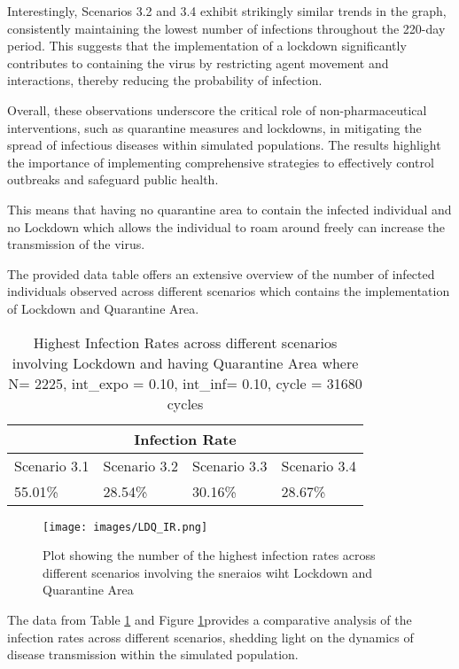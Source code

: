 Interestingly, Scenarios 3.2 and 3.4 exhibit strikingly similar trends in the graph, consistently maintaining the lowest number of infections throughout the 220-day period. This suggests that the implementation of a lockdown significantly contributes to containing the virus by restricting agent movement and interactions, thereby reducing the probability of infection. 

Overall, these observations underscore the critical role of non-pharmaceutical interventions, such as quarantine measures and lockdowns, in mitigating the spread of infectious diseases within simulated populations. The results highlight the importance of implementing comprehensive strategies to effectively control outbreaks and safeguard public health.

This means that having no quarantine area to contain the infected individual and no Lockdown which allows the individual to roam around freely can increase the transmission of the virus. 

The provided data table offers an extensive overview of the number of infected individuals observed across different scenarios which contains the implementation of Lockdown and Quarantine Area. 

\begin{table}[H]
\centering
\begin{tabularx}{\textwidth}{|X|X|X|X|}
	\hline
	\multicolumn{4}{|c|}{\textbf{Infection Rate}} \\
	\hline
	Scenario 3.1& Scenario 3.2 & Scenario 3.3& Scenario 3.4 \\
	\hline
	55.01\% & 28.54\% & 30.16\% & 28.67\%\\
	\hline
\end{tabularx}

\caption{Highest Infection Rates across different scenarios involving Lockdown and having Quarantine Area where N= 2225, int\_expo = 0.10, int\_inf= 0.10, cycle = 31680 cycles }
\label{tab:LD_IR}

\end{table}

\begin{figure}[H]
\centering
\texttt{[image: images/LDQ\_IR.png]}
\caption{Plot showing the number of the highest infection rates across different scenarios involving the sneraios wiht Lockdown and Quarantine Area }
\label{LDQ_IR}
\end{figure}

The data from Table \ref{tab:LD_IR} and Figure \ref{LDQ_IR}provides a comparative analysis of the infection rates across different scenarios, shedding light on the dynamics of disease transmission within the simulated population.


